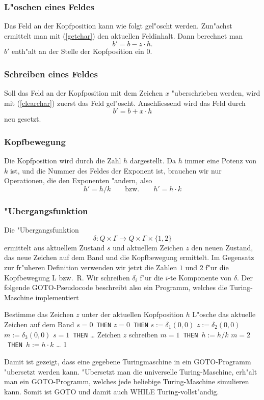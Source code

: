 \subsubsection{L"oschen eines Feldes}
Das Feld an der Kopfposition kann wie folgt gel"oscht werden.
Zun"achst ermittelt man mit (\ref{getchar}) den aktuellen Feldinhalt.
Dann berechnet man
\begin{equation}
b' = b - z\cdot h.
\label{clearchar}
\end{equation}
$b'$ enth"alt an der Stelle der Kopfposition ein $0$.

\subsubsection{Schreiben eines Feldes}
Soll das Feld an der Kopfposition mit dem Zeichen $x$ "uberschrieben
werden, wird mit (\ref{clearchar}) zuerst das Feld gel"oscht.
Anschliessend wird das Feld durch
\[
b'=b+x\cdot h
\]
neu gesetzt.

\subsubsection{Kopfbewegung}
Die Kopfposition wird durch die Zahl $h$ dargestellt.
Da $h$ immer eine Potenz von $k$ ist, und die Nummer des Feldes der
Exponent ist, brauchen wir nur Operationen, die den Exponenten
"andern, also
\[
h'=h/k\qquad\text{bzw.}\qquad h'=h\cdot k
\]

\subsubsection{"Ubergangsfunktion}
Die "Ubergangsfunktion
\[
\delta\colon Q\times \Gamma\to Q\times \Gamma\times\{1, 2\}
\]
ermittelt aus aktuellem Zustand $s$ und
aktuellem Zeichen $z$ den neuen Zustand, das neue Zeichen auf
dem Band und die Kopfbewegung ermittelt. Im Gegensatz zur fr"uheren
Definition verwenden wir jetzt die Zahlen $1$ und $2$ f"ur die
Kopfbewegung L bzw.~R.
Wir schreiben $\delta_i$ f"ur die $i$-te Komponente von $\delta$.
Der folgende GOTO-Pseudocode
beschreibt also ein Programm, welches die Turing-Maschine implementiert
\begin{algorithmic}[1]
\STATE Bestimme das Zeichen $z$ unter der aktuellen Kopfposition $h$
\STATE L"osche das aktuelle Zeichen auf dem Band
$s=0${\tt\ THEN}
$z=0${\tt\ THEN}
\STATE {\tt \ \ \ \ \ \ \ \ }$s:=\delta_1(0,0)$
\STATE {\tt \ \ \ \ \ \ \ \ }$z:=\delta_2(0,0)$
\STATE {\tt \ \ \ \ \ \ \ \ }$m:=\delta_3(0,0)$
$s=1${\tt\ THEN}
\STATE {\tt \ \ \ \ }\dots
{}
\STATE Zeichen $z$ schreiben
$m=1${\tt\ THEN }$h:=h/k$
$m=2${\tt\ THEN }$h:=h\cdot k$
\STATE \dots
{}1
\end{algorithmic}
Damit ist gezeigt, dass eine gegebene Turingmaschine in ein
GOTO-Programm "ubersetzt werden kann. "Ubersetzt man die universelle
Turing-Maschine, erh"alt man ein GOTO-Programm, welches jede beliebige
Turing-Maschine simulieren kann. Somit ist GOTO und damit auch WHILE
Turing-vollst"andig.

